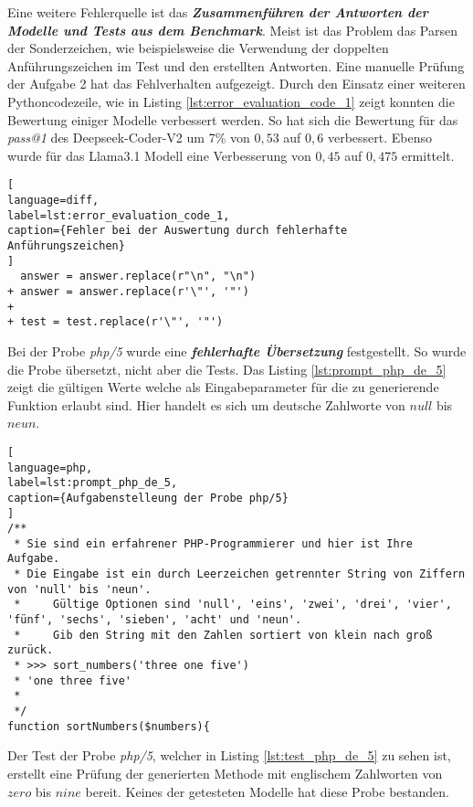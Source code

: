 Eine weitere Fehlerquelle ist das \textit{\textbf{Zusammenführen der Antworten der Modelle und Tests aus dem Benchmark}}. Meist ist das Problem das Parsen der Sonderzeichen, wie beispielsweise die Verwendung der doppelten Anführungszeichen im Test und den erstellten Antworten. Eine manuelle Prüfung der Aufgabe 2 hat das Fehlverhalten aufgezeigt. Durch den Einsatz einer weiteren Pythoncodezeile, wie in Listing \ref{lst:error_evaluation_code_1} zeigt konnten die Bewertung einiger Modelle verbessert werden. So hat sich die Bewertung für das \textit{pass@1} des Deepseek-Coder-V2 um 7\% von $0,53$ auf $0,6$ verbessert. Ebenso wurde für das Llama3.1 Modell eine Verbesserung von $0,45$ auf $0,475$ ermittelt.\vspace{0.2cm}

\begin{lstlisting}[
language=diff,
label=lst:error_evaluation_code_1,
caption={Fehler bei der Auswertung durch fehlerhafte Anführungszeichen}
]
  answer = answer.replace(r"\n", "\n")
+ answer = answer.replace(r'\"', '"')
+ 
+ test = test.replace(r'\"', '"') 
\end{lstlisting}

Bei der Probe \textit{php/5} wurde eine \textit{\textbf{fehlerhafte Übersetzung}} festgestellt. So wurde die Probe übersetzt, nicht aber die Tests. Das Listing \ref{lst:prompt_php_de_5} zeigt die gültigen Werte welche als Eingabeparameter für die zu generierende Funktion erlaubt sind. Hier handelt es sich um deutsche Zahlworte von $null$ bis $neun$.\vspace{0.2cm}

\begin{lstlisting}[
language=php,
label=lst:prompt_php_de_5,
caption={Aufgabenstelleung der Probe php/5}
]
/**
 * Sie sind ein erfahrener PHP-Programmierer und hier ist Ihre Aufgabe.
 * Die Eingabe ist ein durch Leerzeichen getrennter String von Ziffern von 'null' bis 'neun'.
 *     Gültige Optionen sind 'null', 'eins', 'zwei', 'drei', 'vier', 'fünf', 'sechs', 'sieben', 'acht' und 'neun'.
 *     Gib den String mit den Zahlen sortiert von klein nach groß zurück.
 * >>> sort_numbers('three one five')
 * 'one three five'
 *
 */
function sortNumbers($numbers){
\end{lstlisting}

Der Test der Probe \textit{php/5}, welcher in Listing \ref{lst:test_php_de_5} zu sehen ist, erstellt eine Prüfung der generierten Methode mit englischem Zahlworten von $zero$ bis $nine$ bereit. Keines der getesteten Modelle hat diese Probe bestanden.

